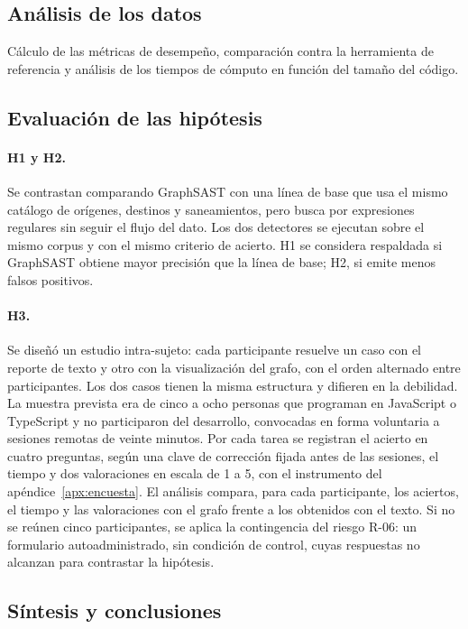 \subsection{Análisis de los datos}\label{sec:n2.3.6}

Cálculo de las métricas de desempeño, comparación contra la herramienta de referencia y análisis de los tiempos de cómputo en función del tamaño del código.

\subsection{Evaluación de las hipótesis}\label{sec:n2.3.7}

\paragraph{H1 y H2.} Se contrastan comparando GraphSAST con una línea de base que usa el mismo catálogo de orígenes, destinos y saneamientos, pero busca por expresiones regulares sin seguir el flujo del dato. Los dos detectores se ejecutan sobre el mismo corpus y con el mismo criterio de acierto. H1 se considera respaldada si GraphSAST obtiene mayor precisión que la línea de base; H2, si emite menos falsos positivos.

\paragraph{H3.} Se diseñó un estudio intra-sujeto: cada participante resuelve un caso con el reporte de texto y otro con la visualización del grafo, con el orden alternado entre participantes. Los dos casos tienen la misma estructura y difieren en la debilidad. La muestra prevista era de cinco a ocho personas que programan en JavaScript o TypeScript y no participaron del desarrollo, convocadas en forma voluntaria a sesiones remotas de veinte minutos. Por cada tarea se registran el acierto en cuatro preguntas, según una clave de corrección fijada antes de las sesiones, el tiempo y dos valoraciones en escala de 1 a 5, con el instrumento del apéndice~\ref{apx:encuesta}. El análisis compara, para cada participante, los aciertos, el tiempo y las valoraciones con el grafo frente a los obtenidos con el texto. Si no se reúnen cinco participantes, se aplica la contingencia del riesgo R-06: un formulario autoadministrado, sin condición de control, cuyas respuestas no alcanzan para contrastar la hipótesis.

\subsection{Síntesis y conclusiones}\label{sec:n2.3.8}

